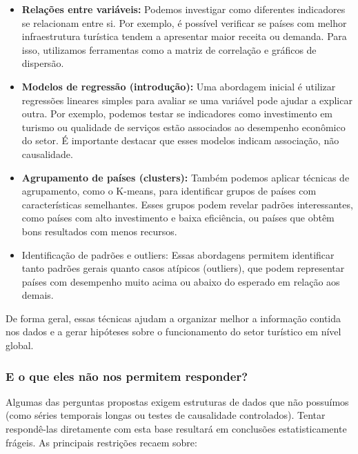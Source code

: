 \documentclass[
]{article}
\providecommand{\tightlist}{%
  \setlength{\itemsep}{0pt}\setlength{\parskip}{0pt}}
\begin{document}
\begin{itemize}
\tightlist
\item
  \textbf{Relações entre variáveis:} Podemos investigar como diferentes
  indicadores se relacionam entre si. Por exemplo, é possível verificar
  se países com melhor infraestrutura turística tendem a apresentar
  maior receita ou demanda. Para isso, utilizamos ferramentas como a
  matriz de correlação e gráficos de dispersão.
\item
  \textbf{Modelos de regressão (introdução):} Uma abordagem inicial é
  utilizar regressões lineares simples para avaliar se uma variável pode
  ajudar a explicar outra. Por exemplo, podemos testar se indicadores
  como investimento em turismo ou qualidade de serviços estão associados
  ao desempenho econômico do setor. É importante destacar que esses
  modelos indicam associação, não causalidade.
\item
  \textbf{Agrupamento de países (clusters):} Também podemos aplicar
  técnicas de agrupamento, como o K-means, para identificar grupos de
  países com características semelhantes. Esses grupos podem revelar
  padrões interessantes, como países com alto investimento e baixa
  eficiência, ou países que obtêm bons resultados com menos recursos.
\item
  Identificação de padrões e outliers: Essas abordagens permitem
  identificar tanto padrões gerais quanto casos atípicos (outliers), que
  podem representar países com desempenho muito acima ou abaixo do
  esperado em relação aos demais.
\end{itemize}

De forma geral, essas técnicas ajudam a organizar melhor a informação
contida nos dados e a gerar hipóteses sobre o funcionamento do setor
turístico em nível global.

\subsubsection{E o que eles não nos permitem
responder?}\label{e-o-que-eles-nuxe3o-nos-permitem-responder}

Algumas das perguntas propostas exigem estruturas de dados que não
possuímos (como séries temporais longas ou testes de causalidade
controlados). Tentar respondê-las diretamente com esta base resultará em
conclusões estatisticamente frágeis. As principais restrições recaem
sobre:
\end{document}
